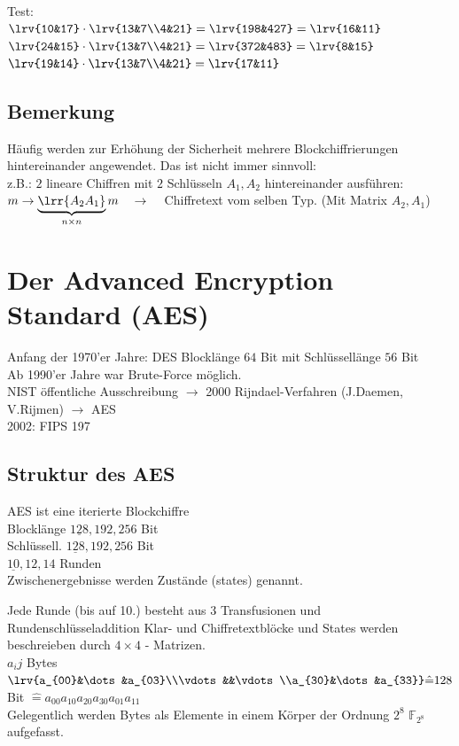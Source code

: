 		Test:\\
		$\lrv{10&17}\cdot\lrv{13&7\\4&21}=\lrv{198&427}=\lrv{16&11}$\\
		$\lrv{24&15}\cdot\lrv{13&7\\4&21}=\lrv{372&483}=\lrv{8&15}$\\
		$\lrv{19&14}\cdot\lrv{13&7\\4&21}=\lrv{17&11}$
		
	\subsection{Bemerkung}
		Häufig werden zur Erhöhung der Sicherheit mehrere Blockchiffrierungen hintereinander angewendet. Das ist nicht immer sinnvoll:\\
		z.B.: $2$ lineare Chiffren mit $2$ Schlüsseln $A_1,A_2$ hintereinander ausführen:\\
		$m\rightarrow\underbrace{\lrr{A_2A_1}}_{n\times n} m \quad \rightarrow\quad$ Chiffretext vom selben Typ. (Mit Matrix $A_2,A_1$)
\section{Der Advanced Encryption Standard (AES)}
	Anfang der 1970'er Jahre: DES Blocklänge $64$ Bit mit Schlüssellänge $56$ Bit\\
	Ab 1990'er Jahre war Brute-Force möglich.\\
	NIST öffentliche Ausschreibung $\rightarrow$	2000 Rijndael-Verfahren (J.Daemen, V.Rijmen) $\rightarrow$ AES\\
	2002: FIPS 197
	\subsection{Struktur des AES}
		AES ist eine iterierte Blockchiffre\\
		Blocklänge $\underline{128},192,256$ Bit\\
		Schlüssell. $\underline{128},192,256$ Bit\\
		$\underline{10},12,14$ Runden\\
		Zwischenergebnisse werden Zustände (states) genannt.
		
		Jede Runde (bis auf 10.) besteht aus 3 Transfusionen und Rundenschlüsseladdition
		Klar- und Chiffretextblöcke und States werden beschreieben durch $4\times 4$ - Matrizen.\\
		$a_ij$ Bytes $\lrv{a_{00}&\dots&a_{03}\\\vdots&&\vdots\\a_{30}&\dots&a_{33}}\hat{=} 128$ Bit $\hat{=} a_{00}a_{10}a_{20}a_{30}a_{01}a_{11}$\\
		Gelegentlich werden Bytes als Elemente in einem Körper der Ordnung $2^8$ $\mathbb{F}_{2^8}$ aufgefasst.
